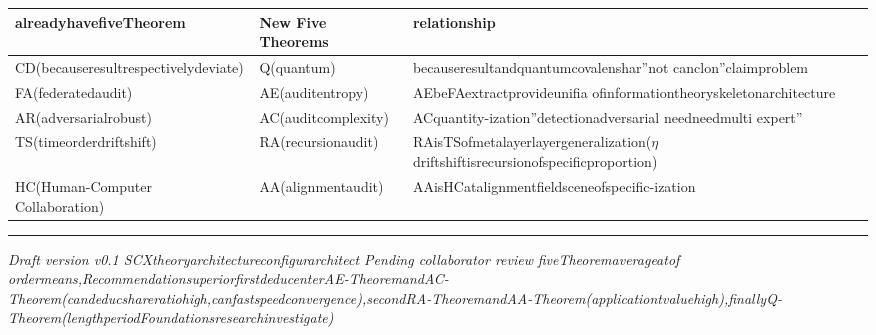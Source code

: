 \documentclass[
  12pt,
]{article}
\begin{document}
\begin{longtable}[]{@{}
  >{\raggedright\arraybackslash}p{}
  >{\raggedright\arraybackslash}p{}
  >{\raggedright\arraybackslash}p{}@{}}
\toprule\noalign{}
\begin{minipage}[b]{\linewidth}\raggedright
alreadyhavefiveTheorem
\end{minipage} & \begin{minipage}[b]{\linewidth}\raggedright
New Five Theorems
\end{minipage} & \begin{minipage}[b]{\linewidth}\raggedright
relationship
\end{minipage} \\
\midrule\noalign{}
\endhead
\bottomrule\noalign{}
\endlastfoot
CD(becauseresultrespectivelydeviate) & Q(quantum) & becauseresultandquantumcovalenshar''not canclon''claimproblem \\
FA(federatedaudit) & AE(auditentropy) & AEbeFAextractprovideunifia ofinformationtheoryskeletonarchitecture \\
AR(adversarialrobust) & AC(auditcomplexity) & ACquantity-ization''detectionadversarial needneedmulti expert'' \\
TS(timeorderdriftshift) & RA(recursionaudit) &
RAisTSofmetalayerlayergeneralization(\(\eta\)driftshiftisrecursionofspecificproportion) \\
HC(Human-Computer Collaboration) & AA(alignmentaudit) & AAisHCatalignmentfieldsceneofspecific-ization \\
\end{longtable}

\begin{center}\rule{0.5\linewidth}{0.5pt}\end{center}

\emph{Draft version v0.1 \textbar{} SCXtheoryarchitectureconfigurarchitect \textbar{} Pending collaborator review}
\emph{fiveTheoremaverageatof  ordermeans,RecommendationsuperiorfirstdeducenterAE-TheoremandAC-Theorem(candeducshareratiohigh,canfastspeedconvergence),secondRA-TheoremandAA-Theorem(applicationtvaluehigh),finallyQ-Theorem(lengthperiodFoundationsresearchinvestigate)}
\end{document}
